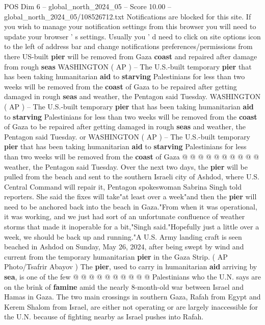 \begin{textsample}{POS Dim 6 – global\_north\_2024\_05 – Score 10.00 – global\_north\_2024\_05/108526712.txt}  \label{ex:f6_pos_145}
Notifications are blocked for this site.
If you wish to manage your notification settings from this browser you will need to update your browser ' s settings.
Usually you ' d need to click on site options icon to the left of address bar and change notifications preferences/permissions from there US-built \textbf{pier} will be removed from Gaza \textbf{coast} and repaired after damage from rough \textbf{seas} WASHINGTON ( AP ) -- The U.S.-built temporary \textbf{pier} that has been taking humanitarian \textbf{aid} to \textbf{starving} Palestinians for less than two weeks will be removed from the \textbf{coast} of Gaza to be repaired after getting damaged in rough \textbf{seas} and weather, the Pentagon said Tuesday.
WASHINGTON ( AP ) -- The U.S.-built temporary \textbf{pier} that has been taking humanitarian \textbf{aid} to \textbf{starving} Palestinians for less than two weeks will be removed from the \textbf{coast} of Gaza to be repaired after getting damaged in rough \textbf{seas} and weather, the Pentagon said Tuesday. or WASHINGTON ( AP ) -- The U.S.-built temporary \textbf{pier} that has been taking humanitarian \textbf{aid} to \textbf{starving} Palestinians for less than two weeks will be removed from the \textbf{coast} of Gaza @ @ @ @ @ @ @ @ @ @ weather, the Pentagon said Tuesday.
Over the next two days, the \textbf{pier} will be pulled from the beach and sent to the southern Israeli city of Ashdod, where U.S.
Central Command will repair it, Pentagon spokeswoman Sabrina Singh told reporters.
She said the fixes will take"at least over a week"and then the \textbf{pier} will need to be anchored back into the beach in Gaza."From when it was operational, it was working, and we just had sort of an unfortunate confluence of weather storms that made it inoperable for a bit,"Singh said."Hopefully just a little over a week, we should be back up and running."A U.S.
Army landing craft is seen beached in Ashdod on Sunday, May 26, 2024, after being swept by wind and current from the temporary humanitarian \textbf{pier} in the Gaza Strip. ( AP Photo/Tsafrir Abayov ) The \textbf{pier}, used to carry in humanitarian \textbf{aid} arriving by \textbf{sea}, is one of the few @ @ @ @ @ @ @ @ @ @ Palestinians who the U.N. says are on the brink of \textbf{famine} amid the nearly 8-month-old war between Israel and Hamas in Gaza.
The two main crossings in southern Gaza, Rafah from Egypt and Kerem Shalom from Israel, are either not operating or are largely inaccessible for the U.N. because of fighting nearby as Israel pushes into Rafah.

\end{textsample}
